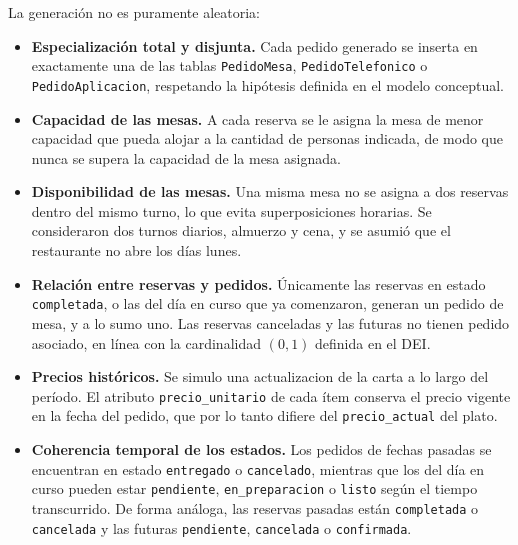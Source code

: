 \documentclass[conference,a4paper,10pt]{IEEEtran}
\begin{document}
La generación no es puramente aleatoria:
\begin{itemize}
    \item \textbf{Especialización total y disjunta.} Cada pedido generado se
    inserta en exactamente una de las tablas \texttt{PedidoMesa},
    \texttt{PedidoTelefonico} o \texttt{PedidoAplicacion}, respetando la
    hipótesis definida en el modelo conceptual.

    \item \textbf{Capacidad de las mesas.} A cada reserva se le asigna la mesa
    de menor capacidad que pueda alojar a la cantidad de personas indicada, de
    modo que nunca se supera la capacidad de la mesa asignada.

    \item \textbf{Disponibilidad de las mesas.} Una misma mesa no se asigna a
    dos reservas dentro del mismo turno, lo que evita superposiciones
    horarias. Se consideraron dos turnos diarios, almuerzo y cena, y se asumió
    que el restaurante no abre los días lunes.

    \item \textbf{Relación entre reservas y pedidos.} Únicamente las reservas
    en estado \texttt{completada}, o las del día en curso que ya comenzaron,
    generan un pedido de mesa, y a lo sumo uno. Las reservas canceladas y las
    futuras no tienen pedido asociado, en línea con la cardinalidad $(0,1)$
    definida en el DEI.

    \item \textbf{Precios históricos.} Se simulo una actualizacion de la
    carta a lo largo del período. El atributo \texttt{precio\_unitario} de cada
    ítem conserva el precio vigente en la fecha del pedido, que por lo tanto
    difiere del \texttt{precio\_actual} del plato.

    \item \textbf{Coherencia temporal de los estados.} Los pedidos de fechas
    pasadas se encuentran en estado \texttt{entregado} o \texttt{cancelado},
    mientras que los del día en curso pueden estar \texttt{pendiente},
    \texttt{en\_preparacion} o \texttt{listo} según el tiempo transcurrido. De
    forma análoga, las reservas pasadas están \texttt{completada} o
    \texttt{cancelada} y las futuras \texttt{pendiente}, \texttt{cancelada} o \texttt{confirmada}.

\end{itemize}
\end{document}
